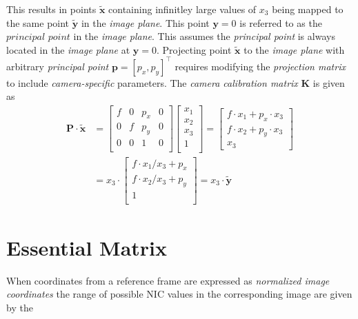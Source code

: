 This results in points $\mathbf{\tilde{x}}$ containing infinitley large values of $x_3$ being mapped to the same point $\mathbf{\tilde{y}}$ in the \textit{image plane}. This point $\mathbf{y}=0$ is referred to as the $\textit{principal point}$ in the \textit{image plane}. This assumes the \textit{principal point} is always located in the \textit{image plane} at $\mathbf{y}=0$. Projecting point $\mathbf{\tilde{x}}$ to the \textit{image plane} with arbitrary \textit{principal point} $\mathbf{p}=[p_x,p_y]^\intercal$ requires modifying the \textit{projection matrix} to include \textit{camera-specific} parameters. The \textit{camera calibration matrix} $\mathbf{K}$ is given as
\begin{equation*}
\begin{split}
\mathbf{P}\cdot\mathbf{\tilde{x}}&=
\begin{bmatrix}
f & 0 & p_x & 0\\
0 & f & p_y & 0\\
0 & 0 & 1 & 0\\
\end{bmatrix}\begin{bmatrix}x_1\\x_2\\x_3\\1\\\end{bmatrix}
=\begin{bmatrix}
f\cdot x_1+p_x\cdot x_3\\
f\cdot x_2+p_y\cdot x_3\\
x_3
\end{bmatrix}\\
&=
x_3\cdot\begin{bmatrix}
f\cdot x_1/x_3+p_x\\
f\cdot x_2/x_3+p_y\\
1\\
\end{bmatrix}
=x_3\cdot\mathbf{\tilde{y}}
\end{split}
\end{equation*} 


\section{Essential Matrix}

\par When coordinates from a reference frame are expressed as \textit{normalized image coordinates} the range of possible NIC values in the corresponding image are given by the 

